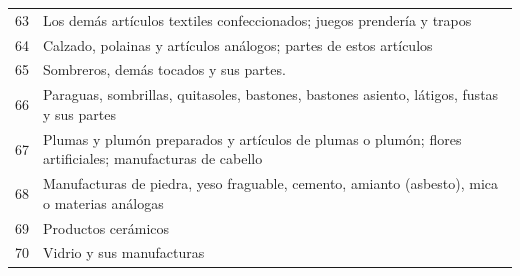 \documentclass[a4paper,openright,12pt]{book}
\begin{document}
\begin{table}[]
{\begin{tabular}{@{}ll@{}}
    63  & Los demás artículos textiles confeccionados; juegos prendería y trapos                                                                                                                                                                                                                         \\
    64  & Calzado, polainas y artículos análogos; partes de estos artículos                                                                                                                                                                                                                              \\
    65  & Sombreros, demás tocados y sus partes.                                                                                                                                                                                                                                                         \\
    66  & Paraguas, sombrillas, quitasoles, bastones, bastones asiento, látigos, fustas y sus partes                                                                                                                                                                                                     \\
    67  & Plumas y plumón preparados y artículos de plumas o plumón; flores artificiales; manufacturas de cabello                                                                                                                                                                                        \\
    68  & Manufacturas de piedra, yeso fraguable, cemento, amianto (asbesto), mica o materias análogas                                                                                                                                                                                                   \\
    69  & Productos cerámicos                                                                                                                                                                                                                                                                            \\
    70  & Vidrio y sus manufacturas                                                                                                                                                                                                                                                                      \\

\end{tabular}}
\end{table}
\end{document}
